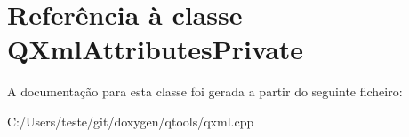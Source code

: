 \hypertarget{class_q_xml_attributes_private}{\section{Referência à classe Q\-Xml\-Attributes\-Private}
\label{class_q_xml_attributes_private}
}


A documentação para esta classe foi gerada a partir do seguinte ficheiro\-:\begin{DoxyCompactItemize}
\item 
C\-:/\-Users/teste/git/doxygen/qtools/qxml.\-cpp\end{DoxyCompactItemize}
